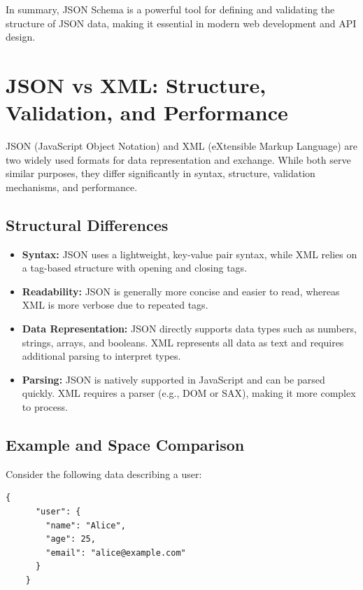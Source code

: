 \documentclass{scrbook}
\begin{document}
	In summary, JSON Schema is a powerful tool for defining and validating the structure of JSON data, making it essential in modern web development and API design.
	
	\section{JSON vs XML: Structure, Validation, and Performance}
	
	JSON (JavaScript Object Notation) and XML (eXtensible Markup Language) are two widely used formats for data representation and exchange. While both serve similar purposes, they differ significantly in syntax, structure, validation mechanisms, and performance.
	
	\subsection{Structural Differences}
	
	\begin{itemize}
		\item \textbf{Syntax:} JSON uses a lightweight, key-value pair syntax, while XML relies on a tag-based structure with opening and closing tags.
		
		\item \textbf{Readability:} JSON is generally more concise and easier to read, whereas XML is more verbose due to repeated tags.
		
		\item \textbf{Data Representation:} JSON directly supports data types such as numbers, strings, arrays, and booleans. XML represents all data as text and requires additional parsing to interpret types.
		
		\item \textbf{Parsing:} JSON is natively supported in JavaScript and can be parsed quickly. XML requires a parser (e.g., DOM or SAX), making it more complex to process.
	\end{itemize}
	
	\subsection{Example and Space Comparison}
	
	Consider the following data describing a user:
	
	\begin{lstlisting}[caption={JSON representation}]
	{
	  "user": {
		"name": "Alice",
		"age": 25,
		"email": "alice@example.com"
	  }
	}
	\end{lstlisting}
	
\end{document}
